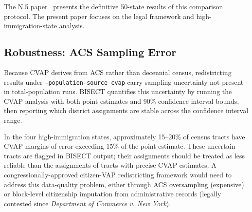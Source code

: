 The N.5 paper~\citep{dellalibera2026n5} presents the definitive 50-state results of this comparison protocol. The present paper focuses on the legal framework and high-immigration-state analysis.

\subsection{Robustness: ACS Sampling Error}

Because CVAP derives from ACS rather than decennial census, redistricting results under \texttt{--population-source cvap} carry sampling uncertainty not present in total-population runs. BISECT quantifies this uncertainty by running the CVAP analysis with both point estimates and 90\% confidence interval bounds, then reporting which district assignments are stable across the confidence interval range.

In the four high-immigration states, approximately 15--20\% of census tracts have CVAP margins of error exceeding 15\% of the point estimate. These uncertain tracts are flagged in BISECT output; their assignments should be treated as less reliable than the assignments of tracts with precise CVAP estimates. A congressionally-approved citizen-VAP redistricting framework would need to address this data-quality problem, either through ACS oversampling (expensive) or block-level citizenship imputation from administrative records (legally contested since \emph{Department of Commerce v. New York}).

